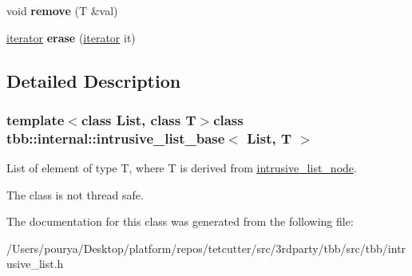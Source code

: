 \begin{DoxyCompactItemize}
\item 
\hypertarget{classtbb_1_1internal_1_1intrusive__list__base_a578b02d9d632a423471e3574edf8c315}{}void {\bfseries remove} (T \&val)\label{classtbb_1_1internal_1_1intrusive__list__base_a578b02d9d632a423471e3574edf8c315}

\item 
\hypertarget{classtbb_1_1internal_1_1intrusive__list__base_ad5922374b3536e14e8b62570162f48c8}{}\hyperlink{classtbb_1_1internal_1_1intrusive__list__base_1_1iterator}{iterator} {\bfseries erase} (\hyperlink{classtbb_1_1internal_1_1intrusive__list__base_1_1iterator}{iterator} it)\label{classtbb_1_1internal_1_1intrusive__list__base_ad5922374b3536e14e8b62570162f48c8}

\end{DoxyCompactItemize}


\subsection{Detailed Description}
\subsubsection*{template$<$class List, class T$>$class tbb\+::internal\+::intrusive\+\_\+list\+\_\+base$<$ List, T $>$}

List of element of type T, where T is derived from \hyperlink{structtbb_1_1internal_1_1intrusive__list__node}{intrusive\+\_\+list\+\_\+node}. 

The class is not thread safe. 

The documentation for this class was generated from the following file\+:\begin{DoxyCompactItemize}
\item 
/\+Users/pourya/\+Desktop/platform/repos/tetcutter/src/3rdparty/tbb/src/tbb/intrusive\+\_\+list.\+h\end{DoxyCompactItemize}
